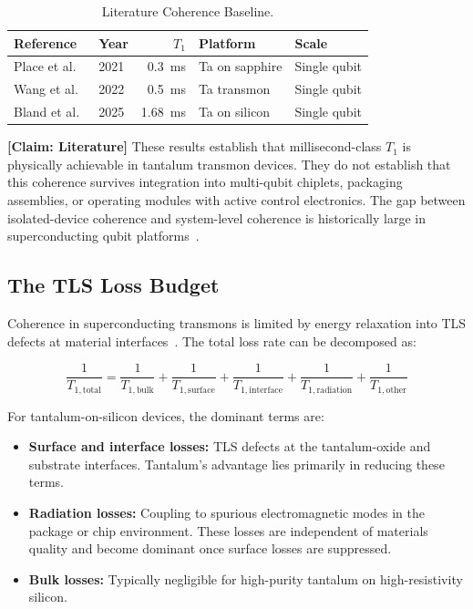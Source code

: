 \documentclass[conference]{IEEEtran}
\begin{document}
\begin{table}[htbp]
\centering
\caption{Literature Coherence Baseline.}
\label{tab:lit_baseline}
\begin{tabular}{llrll}
\toprule
\textbf{Reference} & \textbf{Year} & \textbf{$T_1$} & \textbf{Platform} & \textbf{Scale} \\
\midrule
Place et al.~\cite{place2021} & 2021 & 0.3~ms & Ta on sapphire & Single qubit \\
Wang et al.~\cite{wang2022} & 2022 & 0.5~ms & Ta transmon & Single qubit \\
Bland et al.~\cite{bland2025} & 2025 & 1.68~ms & Ta on silicon & Single qubit \\
\bottomrule
\end{tabular}
\end{table}

\textbf{[Claim: Literature]} These results establish that millisecond-class $T_1$ is physically achievable in tantalum transmon devices. They do not establish that this coherence survives integration into multi-qubit chiplets, packaging assemblies, or operating modules with active control electronics. The gap between isolated-device coherence and system-level coherence is historically large in superconducting qubit platforms~\cite{kjaergaard2020}.

\subsection{The TLS Loss Budget}

Coherence in superconducting transmons is limited by energy relaxation into TLS defects at material interfaces~\cite{mueller2019}. The total loss rate can be decomposed as:

\begin{equation}
\frac{1}{T_{1,\text{total}}} = \frac{1}{T_{1,\text{bulk}}} + \frac{1}{T_{1,\text{surface}}} + \frac{1}{T_{1,\text{interface}}} + \frac{1}{T_{1,\text{radiation}}} + \frac{1}{T_{1,\text{other}}}
\end{equation}

For tantalum-on-silicon devices, the dominant terms are:

\begin{itemize}
\item \textbf{Surface and interface losses:} TLS defects at the tantalum-oxide and substrate interfaces. Tantalum's advantage lies primarily in reducing these terms.
\item \textbf{Radiation losses:} Coupling to spurious electromagnetic modes in the package or chip environment. These losses are independent of materials quality and become dominant once surface losses are suppressed.
\item \textbf{Bulk losses:} Typically negligible for high-purity tantalum on high-resistivity silicon.
\end{itemize}
\end{document}
